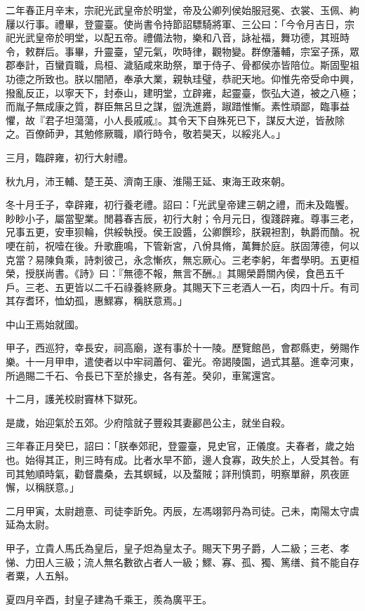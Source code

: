 \begin{pinyinscope}
二年春正月辛末，宗祀光武皇帝於明堂，帝及公卿列侯始服冠冕、衣裳、玉佩、絇屨以行事。禮畢，登靈臺。使尚書令持節詔驃騎將軍、三公曰：「今令月吉日，宗祀光武皇帝於明堂，以配五帝。禮備法物，樂和八音，詠祉福，舞功德，其班時令，敕群后。事畢，升靈臺，望元氣，吹時律，觀物變。群僚藩輔，宗室子孫，眾郡奉計，百蠻貢職，烏桓、濊貊咸來助祭，單于侍子、骨都侯亦皆陪位。斯固聖祖功德之所致也。朕以闇陋，奉承大業，親執珪璧，恭祀天地。仰惟先帝受命中興，撥亂反正，以寧天下，封泰山，建明堂，立辟雍，起靈臺，恢弘大道，被之八極；而胤子無成康之質，群臣無呂旦之謀，盥洗進爵，踧踖惟慚。素性頑鄙，臨事益懼，故『君子坦蕩蕩，小人長戚戚』。其令天下自殊死已下，謀反大逆，皆赦除之。百僚師尹，其勉修厥職，順行時令，敬若昊天，以綏兆人。」

三月，臨辟雍，初行大射禮。

秋九月，沛王輔、楚王英、濟南王康、淮陽王延、東海王政來朝。

冬十月壬子，幸辟雍，初行養老禮。詔曰：「光武皇帝建三朝之禮，而未及臨饗。眇眇小子，屬當聖業。閒暮春吉辰，初行大射；令月元日，復踐辟雍。尊事三老，兄事五更，安車狈輪，供綏執授。侯王設醬，公卿饌珍，朕親袒割，執爵而酳。祝哽在前，祝噎在後。升歌鹿鳴，下管新宮，八佾具脩，萬舞於庭。朕固薄德，何以克當？易陳負乘，詩刺彼己，永念慚疚，無忘厥心。三老李躬，年耆學明。五更桓榮，授朕尚書。《詩》曰：『無德不報，無言不酬。』其賜榮爵關內侯，食邑五千戶。三老、五更皆以二千石祿養終厥身。其賜天下三老酒人一石，肉四十斤。有司其存耆环，恤幼孤，惠鰥寡，稱朕意焉。」

中山王焉始就國。

甲子，西巡狩，幸長安，祠高廟，遂有事於十一陵。歷覽館邑，會郡縣吏，勞賜作樂。十一月甲申，遣使者以中牢祠蕭何、霍光。帝謁陵園，過式其墓。進幸河東，所過賜二千石、令長已下至於掾史，各有差。癸卯，車駕還宮。

十二月，護羌校尉竇林下獄死。

是歲，始迎氣於五郊。少府陰就子豐殺其妻酈邑公主，就坐自殺。

三年春正月癸巳，詔曰：「朕奉郊祀，登靈臺，見史官，正儀度。夫春者，歲之始也。始得其正，則三時有成。比者水旱不節，邊人食寡，政失於上，人受其咎。有司其勉順時氣，勸督農桑，去其螟蜮，以及蝥賊；詳刑慎罰，明察單辭，夙夜匪懈，以稱朕意。」

二月甲寅，太尉趙憙、司徒李訢免。丙辰，左馮翊郭丹為司徒。己未，南陽太守虞延為太尉。

甲子，立貴人馬氏為皇后，皇子炟為皇太子。賜天下男子爵，人二級；三老、孝悌、力田人三級；流人無名數欲占者人一級；鰥、寡、孤、獨、篤缮、貧不能自存者粟，人五斛。

夏四月辛酉，封皇子建為千乘王，羨為廣平王。


\end{pinyinscope}
